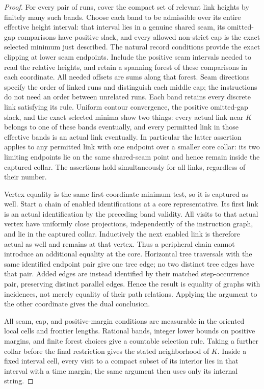 \begin{proof}
For every pair of runs, cover the compact set of relevant link heights
by finitely many such bands.  Choose each band to be admissible over
its entire effective height interval: that interval lies in a genuine
shared seam, its omitted-gap comparisons have positive slack, and
every allowed non-strict cap is the exact selected minimum just
described.  The natural record conditions provide the exact clipping
at lower seam endpoints.  Include the positive seam intervals
needed to read the relative heights, and retain a spanning forest
of these comparisons in each coordinate.  All needed offsets are
sums along that forest.  Seam directions specify the order of
linked runs and distinguish each middle cap; the instructions
do not need an order between unrelated runs.  Each band retains every discrete link
satisfying its rule.  Uniform contour convergence, the positive
omitted-gap slack, and the exact selected minima show two things:
every actual link near $K$ belongs to one of these bands eventually,
and every permitted link in those effective bands is an actual link
eventually.  In particular the latter assertion applies to any
permitted link with one endpoint over a smaller core collar: its
two limiting endpoints lie on the same shared-seam point and hence
remain inside the captured collar.  The
assertions hold simultaneously for all links, regardless of their
number.

Vertex equality is the same first-coordinate minimum test, so it is
captured as well.  Start a chain of enabled identifications at a
core representative.  Its first link is an actual identification
by the preceding band validity.  All visits to that actual vertex
have uniformly close projections, independently of the instruction
graph, and lie in the captured collar.  Inductively the next enabled
link is therefore actual as well and remains at that vertex.
Thus a peripheral chain cannot introduce an additional equality
at the core.  Horizontal tree traversals with the same identified
endpoint pair give one tree edge; no two distinct tree edges have
that pair.  Added edges are instead identified by their matched
step-occurrence pair, preserving distinct parallel edges.  Hence the
result is equality of graphs with incidences, not merely equality
of their path relations.  Applying the argument to the other
coordinate gives the dual conclusion.

All seam, cap, and positive-margin conditions are measurable in the
oriented local cells and frontier lengths.  Rational bands, integer
lower bounds on positive margins, and finite forest choices give a
countable selection rule.  Taking a further collar before the final
restriction gives the stated neighborhood of $K$.  Inside a fixed
interval cell, every visit to a compact subset of its interior lies
in that interval with a time margin; the same argument then uses
only its internal string.
\end{proof}

